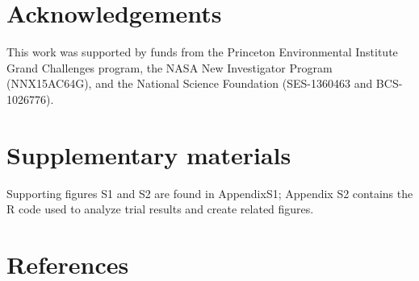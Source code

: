 \documentclass[preprint,12pt,authoryear]{elsarticle}
\begin{document}
\section*{Acknowledgements}
This work was supported by funds from the Princeton Environmental Institute Grand Challenges program, the NASA New Investigator Program (NNX15AC64G), and the National Science Foundation (SES-1360463 and BCS-1026776).   

\section*{Supplementary materials}
Supporting figures S1 and S2 are found in AppendixS1; Appendix S2 contains the R code used to analyze trial results and create related figures. 



\section*{References}
 



%
%
%
\end{document}
